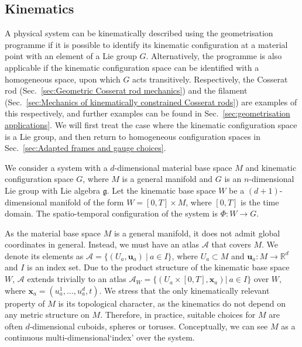 \subsection{Kinematics} \label{sec:(summary) kinematics}

A physical system can be kinematically described using the geometrisation programme if it is possible to identify its kinematic configuration at a material point with an element of a Lie group $G$. Alternatively, the programme is also applicable if the kinematic configuration space can be identified with a homogeneous space, upon which $G$ acts transitively. Respectively, the Cosserat rod (Sec.~\ref{sec:Geometric Cosserat rod mechanics}) and the filament (Sec.~\ref{sec:Mechanics of kinematically constrained Cosserat rods}) are examples of this respectively, and further examples can be found in Sec.~\ref{sec:geometrisation applications}. We will first treat the case where the kinematic configuration space is a Lie group, and then return to homogeneous configuration spaces in Sec.~\ref{sec:Adapted frames and gauge choices}.

We consider a system with a $d$-dimensional material base space $M$ and kinematic configuration space $G$, where $M$ is a general manifold and $G$ is an $n$-dimensional Lie group with Lie algebra $\mathfrak{g}$. Let the kinematic base space $W$ be a $(d+1)$-dimensional manifold of the form $W = [0, T] \times M$, where $[0, T]$ is the time domain. The spatio-temporal configuration of the system is $\Phi : W \to G$.

As the material base space $M$ is a general manifold, it does not admit global coordinates in general. Instead, we must have an atlas $\mathcal{A}$ that covers $M$. We denote its elements as $\mathcal{A} = \{ (U_a, \mathbf{u}_a)\ |\ a \in I \}$, where $U_a \subset M$ and $\mathbf{u}_a : M \to \mathbb{R}^d$ and $I$ is an index set. Due to the product structure of the kinematic base space $W$, $\mathcal{A}$ extends trivially to an atlas $\mathcal{A}_W = \{ (U_a \times [0, T], \mathbf{x}_a) |\ a \in I \}$ over $W$, where $\mathbf{x}_a = (u_a^1, \dots, u^d_a, t)$. We stress that the only kinematically relevant property of $M$ is its topological character, as the kinematics do not depend on any metric structure on $M$. Therefore, in practice, suitable choices for $M$ are often $d$-dimensional cuboids, spheres or toruses. Conceptually, we can see $M$ as a continuous multi-dimensional`index' over the system.

